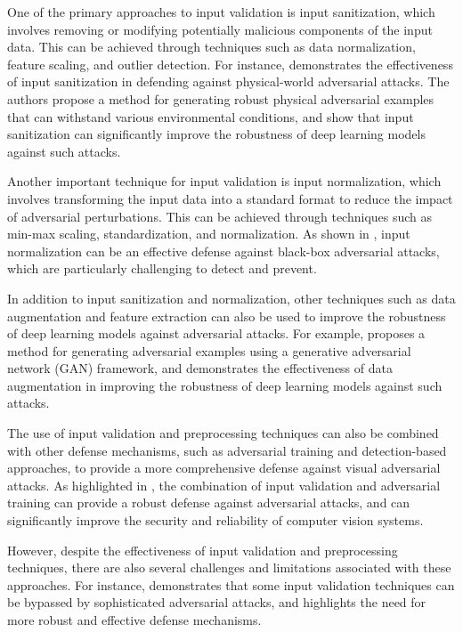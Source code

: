 \documentclass[11pt,a4paper]{article}
\begin{document}
One of the primary approaches to input validation is input sanitization, which involves removing or modifying potentially malicious components of the input data. This can be achieved through techniques such as data normalization, feature scaling, and outlier detection. For instance, \cite{arxiv:1707.08945} demonstrates the effectiveness of input sanitization in defending against physical-world adversarial attacks. The authors propose a method for generating robust physical adversarial examples that can withstand various environmental conditions, and show that input sanitization can significantly improve the robustness of deep learning models against such attacks.

Another important technique for input validation is input normalization, which involves transforming the input data into a standard format to reduce the impact of adversarial perturbations. This can be achieved through techniques such as min-max scaling, standardization, and normalization. As shown in \cite{doi:10.1109/tip.2021.3092822}, input normalization can be an effective defense against black-box adversarial attacks, which are particularly challenging to detect and prevent.

In addition to input sanitization and normalization, other techniques such as data augmentation and feature extraction can also be used to improve the robustness of deep learning models against adversarial attacks. For example, \cite{doi:10.1109/iccvw.2019.00257} proposes a method for generating adversarial examples using a generative adversarial network (GAN) framework, and demonstrates the effectiveness of data augmentation in improving the robustness of deep learning models against such attacks.

The use of input validation and preprocessing techniques can also be combined with other defense mechanisms, such as adversarial training and detection-based approaches, to provide a more comprehensive defense against visual adversarial attacks. As highlighted in \cite{arxiv:1712.07107}, the combination of input validation and adversarial training can provide a robust defense against adversarial attacks, and can significantly improve the security and reliability of computer vision systems.

However, despite the effectiveness of input validation and preprocessing techniques, there are also several challenges and limitations associated with these approaches. For instance, \cite{arxiv:1711.08478} demonstrates that some input validation techniques can be bypassed by sophisticated adversarial attacks, and highlights the need for more robust and effective defense mechanisms.
\end{document}
